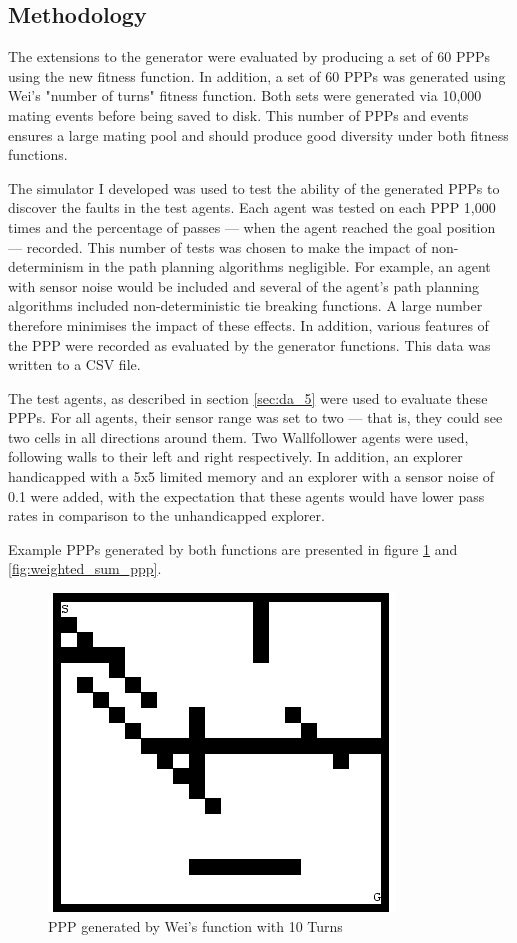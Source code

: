 \documentclass[authoryearcitations]{UoYCSproject}
\begin{document}
\subsection{Methodology}
\label{sec:gen_eval_method}

The extensions to the generator were evaluated by producing a set of 60 PPPs using the new fitness function. In addition, a set of 60 PPPs was generated using Wei's "number of turns" fitness function. Both sets were generated via 10,000 mating events before being saved to disk. This number of PPPs and events ensures a large mating pool and should produce good diversity under both fitness functions.

The simulator I developed was used to test the ability of the generated PPPs to discover the faults in the test agents. Each agent was tested on each PPP 1,000 times and the percentage of passes --- when the agent reached the goal position --- recorded. This number of tests was chosen to make the impact of non-determinism in the path planning algorithms negligible. For example, an agent with sensor noise would be included and several of the agent's path planning algorithms included non-deterministic tie breaking functions. A large number therefore minimises the impact of these effects. In addition, various features of the PPP were recorded as evaluated by the generator functions. This data was written to a CSV file.

The test agents, as described in section \ref{sec:da_5} were used to evaluate these PPPs. For all agents, their sensor range was set to two --- that is, they could see two cells in all directions around them. Two Wallfollower agents were used, following walls to their left and right respectively. In addition, an explorer handicapped with a 5x5 limited memory and an explorer with a sensor noise of 0.1 were added, with the expectation that these agents would have lower pass rates in comparison to the unhandicapped explorer.

Example PPPs generated by both functions are presented in figure \ref{fig:wei_ppp} and \ref{fig:weighted_sum_ppp}.

\begin{figure}
\graphicspath{ {EvalPics/} }
\includegraphics[scale=0.65]{wei_26.png}
\caption{PPP generated by Wei's function with 10 Turns}
\label{fig:wei_ppp}
\end{figure}
\end{document}

